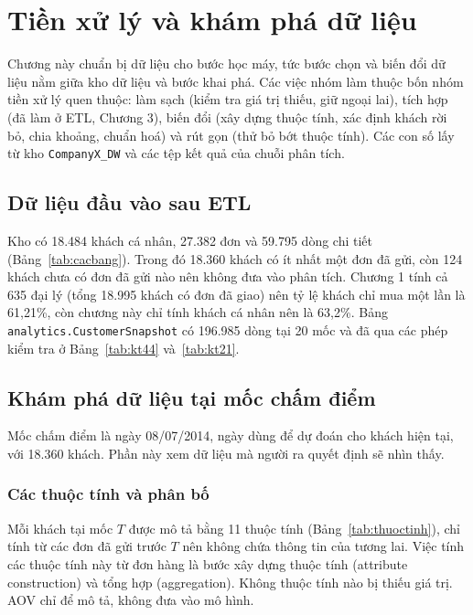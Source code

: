 \section{Tiền xử lý và khám phá dữ liệu}

Chương này chuẩn bị dữ liệu cho bước học máy, tức bước chọn và biến đổi dữ liệu nằm giữa kho dữ liệu và bước khai phá. Các việc nhóm làm thuộc bốn nhóm tiền xử lý quen thuộc: làm sạch (kiểm tra giá trị thiếu, giữ ngoại lai), tích hợp (đã làm ở ETL, Chương 3), biến đổi (xây dựng thuộc tính, xác định khách rời bỏ, chia khoảng, chuẩn hoá) và rút gọn (thử bỏ bớt thuộc tính). Các con số lấy từ kho \texttt{CompanyX\_DW} và các tệp kết quả của chuỗi phân tích.

\subsection{Dữ liệu đầu vào sau ETL}
Kho có 18.484 khách cá nhân, 27.382 đơn và 59.795 dòng chi tiết (Bảng~\ref{tab:cacbang}). Trong đó 18.360 khách có ít nhất một đơn đã gửi, còn 124 khách chưa có đơn đã gửi nào nên không đưa vào phân tích. Chương 1 tính cả 635 đại lý (tổng 18.995 khách có đơn đã giao) nên tỷ lệ khách chỉ mua một lần là 61,21\%, còn chương này chỉ tính khách cá nhân nên là 63,2\%. Bảng \texttt{analytics.\allowbreak CustomerSnapshot} có 196.985 dòng tại 20 mốc và đã qua các phép kiểm tra ở Bảng~\ref{tab:kt44} và~\ref{tab:kt21}.

\subsection{Khám phá dữ liệu tại mốc chấm điểm}
Mốc chấm điểm là ngày 08/07/2014, ngày dùng để dự đoán cho khách hiện tại, với 18.360 khách. Phần này xem dữ liệu mà người ra quyết định sẽ nhìn thấy.

\subsubsection{Các thuộc tính và phân bố}
Mỗi khách tại mốc $T$ được mô tả bằng 11 thuộc tính (Bảng~\ref{tab:thuoctinh}), chỉ tính từ các đơn đã gửi trước $T$ nên không chứa thông tin của tương lai. Việc tính các thuộc tính này từ đơn hàng là bước xây dựng thuộc tính (attribute construction) và tổng hợp (aggregation). Không thuộc tính nào bị thiếu giá trị. AOV chỉ để mô tả, không đưa vào mô hình.

